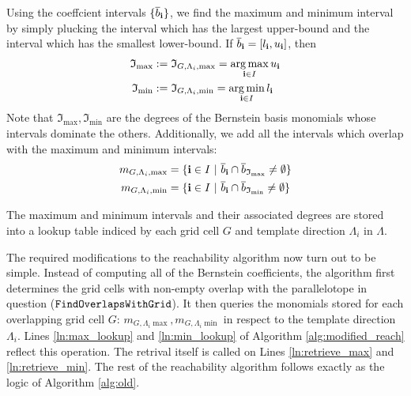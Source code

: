 \begin{enumerate}[leftmargin=*]


 Using the coeffcient intervals $\{\overline{b}_{{\bf i}}\}$, we find the maximum and minimum interval by simply plucking the interval which has the largest upper-bound and the interval which has the smallest lower-bound. If $\overline{b}_{{\bf i}} = [l_{\bf i}, u_{\bf i}]$, then
%
\begin{align}
  \mathfrak{I}_{\max} & := \mathfrak{I}_{G,\Lambda_i, \max}  = \operatorname*{arg\,max}_{{\bf i} \in I} u_{\bf i} \\
  \mathfrak{I}_{\min} & := \mathfrak{I}_{G,\Lambda_i, \min} = \operatorname*{arg\,min}_{{\bf i} \in I} l_{\bf i}
\end{align}
%
Note that $\mathfrak{I}_{\max}, \mathfrak{I}_{\min}$ are the degrees of the Bernstein basis monomials whose intervals dominate the others. Additionally, we add all the intervals which overlap with the maximum and minimum intervals:
%
\begin{align}
  \begin{split}
      m_{G,\Lambda_i,\max} & = \{{\bf i} \in I ~|~ \overline{b}_{{\bf i}} \cap \overline{b}_{\mathfrak{I}_{\max}} \neq \emptyset \}\\
      m_{G,\Lambda_i,\min} & = \{{\bf i} \in I ~|~ \overline{b}_{{\bf i}} \cap \overline{b}_{\mathfrak{I}_{\min}} \neq \emptyset \}
  \end{split}
\end{align}

 The maximum and minimum intervals and their associated degrees are stored into a lookup table indiced by each grid cell $G$ and template direction $\Lambda_i$ in $\Lambda$.
\end{enumerate}

The required modifications to the reachability algorithm now turn out to be simple.
%
Instead of computing all of the Bernstein coefficients, the algorithm first determines the grid cells with non-empty overlap with the parallelotope in question ($\texttt{FindOverlapsWithGrid}$). It then queries the monomials stored for each overlapping grid cell $G$: $ m_{G,\Lambda_i\max}, m_{G,\Lambda_i \min}$ in respect to the template direction $\Lambda_i$. Lines \ref{ln:max_lookup} and \ref{ln:min_lookup} of Algorithm \ref{alg:modified_reach} reflect this operation. The retrival itself is called on Lines \ref{ln:retrieve_max} and \ref{ln:retrieve_min}. The rest of the reachability algorithm follows exactly as the logic of Algorithm \ref{alg:old}.



